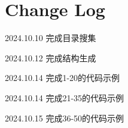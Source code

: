 \section*{Change Log}

2024.10.10  完成目录搜集

2024.10.12  完成结构生成

2024.10.14  完成1-20的代码示例

2024.10.14  完成21-35的代码示例

2024.10.15  完成36-50的代码示例